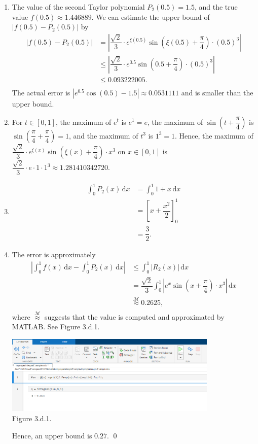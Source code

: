 \documentclass[11pt]{article}
\theoremstyle{break}
\newcommand{\ddi}{\text{$\,$d}}
\numberwithin{equation}{theorem}
\begin{document}
\begin{enumerate}
    \item The value of the second Taylor polynomial $P_2(0.5)=1.5$, and the true value $f(0.5)\approx1.446889$. We can estimate the upper bound of $|f(0.5)-P_2(0.5)|$ by \vspace{-0.6em}
    \begin{align*}
        |f(0.5)-P_2(0.5)|&=\left\lvert \dfrac{\sqrt{2}}{3}\cdot e^{\xi(0.5)}\sin\left(\xi(0.5)+\dfrac{\pi}{4}\right) \cdot ({0.5})^3\right\rvert\\
        &\leq\left\lvert \dfrac{\sqrt{2}}{3}\cdot e^{0.5}\sin\left(0.5+\dfrac{\pi}{4}\right) \cdot ({0.5})^3\right\rvert\\
        &\leq 0.093222005.\\[-3.4em]
    \end{align*}
    The actual error is $\left\lvert e^{0.5}\cos(0.5)-1.5\right\rvert\approx0.0531111$ and is smaller than the upper bound.
    \item For $t\in[0, 1]$, the maximum of $e^t$ is $e^1=e$, the maximum of $\sin\left(t+\dfrac{\pi}{4}\right)$ is $\sin\left(\dfrac{\pi}{4}+\dfrac{\pi}{4}\right)=1$, and the maximum of $t^3$ is $1^3=1$. Hence, the maximum of $\dfrac{\sqrt{2}}{3}\cdot e^{\xi(x)}\sin\left(\xi(x)+\dfrac{\pi}{4}\right) \cdot x^3$ on $x\in[0, 1]$ is $\dfrac{\sqrt{2}}{3}\cdot e\cdot1\cdot1^3\approx1.281410342720$.
    \item \begin{align*}
        \int_{0}^{1}P_2(x)\ddi x&=\int_{0}^{1}1+x\ddi x\\
        &=\left[x+\dfrac{x^2}{2}\right]_0^1\\
        &=\dfrac{3}{2}.
    \end{align*}
    \item The error is approximately \vspace{-0.6em}
    \begin{align*}
        \left|\int_{0}^{1}f(x)\ddi x-\int_{0}^{1}P_2(x)\ddi x\right|&\leq\int_{0}^{1}|R_2(x)|\ddi x\\
        &=\dfrac{\sqrt{2}}{3}\int_{0}^{1}\left|e^x\sin\left(x+\dfrac{\pi}{4}\right) \cdot x^3\right|\ddi x\\
        &\overset{\mathcal{M}}{\approx}0.2625,\\[-3.4em]
    \end{align*}
    where $\overset{\mathcal{M}}{\approx}$ suggests that the value is computed and approximated by MATLAB. See Figure 3.d.1.
    \begin{center}
        \includegraphics[width=0.8\textwidth]{P3d1.png}\\
        Figure 3.d.1.
    \end{center}
    Hence, an upper bound is $0.27$. \qed
\end{enumerate}
\end{document}
